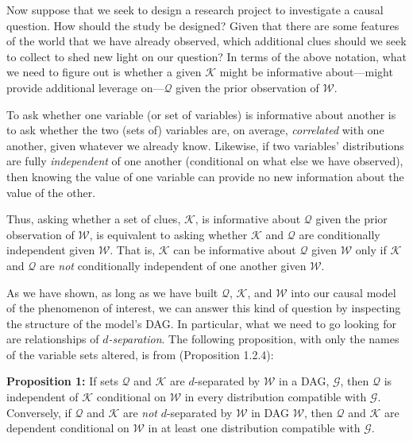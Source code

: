 \documentclass[
  12pt,
]{book}
\begin{document}
Now suppose that we seek to design a research project to investigate a causal question. How should the study be designed? Given that there are some features of the world that we have already observed, which additional clues should we seek to collect to shed new light on our question? In terms of the above notation, what we need to figure out is whether a given \(\mathcal K\) might be informative about---might provide additional leverage on---\(\mathcal Q\) given the prior observation of \(\mathcal W\).

To ask whether one variable (or set of variables) is informative about another is to ask whether the two (sets of) variables are, on average, \emph{correlated} with one another, given whatever we already know. Likewise, if two variables' distributions are fully \emph{independent} of one another (conditional on what else we have observed), then knowing the value of one variable can provide no new information about the value of the other.

Thus, asking whether a set of clues, \(\mathcal K\), is informative about \(\mathcal Q\) given the prior observation of \(\mathcal W\), is equivalent to asking whether \(\mathcal K\) and \(\mathcal Q\) are conditionally independent given \(\mathcal W\). That is, \(\mathcal K\) can be informative about \(\mathcal Q\) given \(\mathcal W\) only if \(\mathcal K\) and \(\mathcal Q\) are \emph{not} conditionally independent of one another given \(\mathcal W\).

As we have shown, as long as we have built \(\mathcal Q\), \(\mathcal K\), and \(\mathcal W\) into our causal model of the phenomenon of interest, we can answer this kind of question by inspecting the structure of the model's DAG. In particular, what we need to go looking for are relationships of \emph{\(d\)-separation}. The following proposition, with only the names of the variable sets altered, is from \citet{pearl2009causality} (Proposition 1.2.4):

\textbf{Proposition 1:} If sets \(\mathcal Q\) and \(\mathcal K\) are \(d\)-separated by \(\mathcal W\) in a DAG, \(\mathcal G\), then \(\mathcal Q\) is independent of \(\mathcal K\) conditional on \(\mathcal W\) in every distribution compatible with \(\mathcal G\). Conversely, if \(\mathcal Q\) and \(\mathcal K\) are \emph{not} \(d\)-separated by \(\mathcal W\) in DAG \(\mathcal W\), then \(\mathcal Q\) and \(\mathcal K\) are dependent conditional on \(\mathcal W\) in at least one distribution compatible with \(\mathcal G\).
\end{document}
